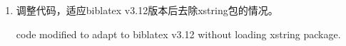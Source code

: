 


\label{up:181104}
\begin{enumerate}

\item 调整代码，适应biblatex v3.12版本后去除xstring包的情况。

code modified to adapt to biblatex v3.12 without loading xstring package.


\end{enumerate}


